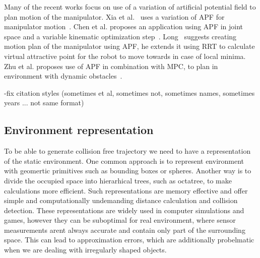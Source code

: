 \documentclass[letterpaper, 10 pt, conference]{ieeeconf}  %
\begin{document}
Many of the recent works focus on use of a variation of artificial potential field to plan motion of the manipulator. Xia et al.~\cite{c49} uses a variation of APF for manipulator motion~\cite{c49}. Chen et al. proposes an application using APF in joint space and a variable kinematic optimization step~\cite{c50}. Long~\cite{c44} suggests creating motion plan of the manipulator using APF, he extends it using RRT to calculate virtual attractive point for the robot to move towards in case of local minima. Zhu et al. proposes use of APF in combination with MPC, to plan in environment with dynamic obstacles~\cite{c48}.

\alert{
 -fix citation styles (sometimes et al, sometimes not, sometimes names, sometimes years ... not same format)
}


\subsection{Environment representation}

To be able to generate collision free trajectory we need to have a representation of the static environment. One common approach is to represent environment with geomertic primitives such as bounding boxes or spheres. Another way is to divide the occupied space into hierarhical trees, such as octatree, to make calculations more efficient. Such representations are memory effective and offer simple and computationally undemanding distance calculation and collision detection. These representations are widely used in computer simulations and games, however they can be suboptimal for real environment, where sensor measurements arent always accurate and contain only part of the surrounding space. This can lead to approximation errors, which are additionally probelmatic when we are dealing with irregularly shaped objects.
\end{document}
